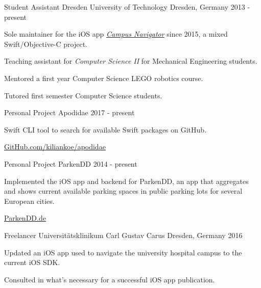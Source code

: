 

\begin{cventries}

\cventry
	{Student Assistant}
	{Dresden University of Technology}
	{Dresden, Germany}
	{2013 - present}
	{
		\begin{cvitems}
			\item {Sole maintainer for the iOS app \href{https://navigator.tu-dresden.de/mobile_apps}{\emph{Campus Navigator}} since 2015, a mixed Swift/Objective-C project.}
			\item {Teaching assistant for \emph{Computer Science II} for Mechanical Engineering students.}
			\item {Mentored a first year Computer Science LEGO robotics course.}
			\item {Tutored first semester Computer Science students.}
		\end{cvitems}
	}
	
\cventry
	{Personal Project}
	{Apodidae}
	{}
	{2017 - present}
	{
		\begin{cvitems}
			\item {Swift CLI tool to search for available Swift packages on GitHub.}
			\item {\href{https://github.com/kiliankoe/apodidae}{GitHub.com/kiliankoe/apodidae}}
		\end{cvitems}
	}
	
\cventry
	{Personal Project}
	{ParkenDD}
	{}
	{2014 - present}
	{
		\begin{cvitems}
			\item {Implemented the iOS app and backend for ParkenDD, an app that aggregates and shows current available parking spaces in public parking lots for several European cities.}
			\item {\href{https://parkendd.de}{ParkenDD.de}}
		\end{cvitems}
	}
	
\cventry
	{Freelancer}
	{Universitätsklinikum Carl Gustav Carus}
	{Dresden, Germany}
	{2016}
	{
		\begin{cvitems}
			\item {Updated an iOS app used to navigate the university hospital campus to the current iOS SDK.}
			\item {Consulted in what's necessary for a successful iOS app publication.}
		\end{cvitems}
	}
	

\end{cventries}
